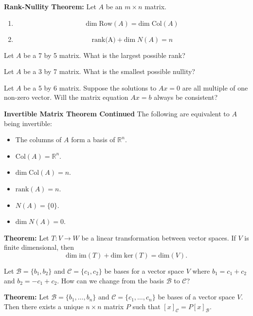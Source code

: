 \documentclass[12pt,letterpaper]{article}
\begin{document}
\newpage

{\bf Rank-Nullity Theorem:} Let $A$ be an $m\times n$ matrix.
\begin{enumerate}
\item[a.] $$\text{dim} \;\text{Row}(A)= \text{dim} \;\text{Col}(A)$$
\item[b.] $$\text{rank(A)}+\text{dim} \;N(A) =n$$
\end{enumerate}

\begin{enumerate}

\Problem 

\Part Let $A$ be a 7 by 5 matrix. What is the largest possible rank?

\vfill

\Part Let $A$ be a 3 by 7 matrix. What is the smallest possible nullity?

\vfill

\Part Let $A$ be a 5 by 6 matrix. Suppose the solutions to $Ax=0$ are all multiple of one non-zero vector. Will the matrix equation $Ax=b$ always be consistent?

\vfill


{\bf Invertible Matrix Theorem Continued} The following are equivalent to $A$ being invertible:
\begin{itemize}
\item[m.] The columns of $A$ form a basis of $\mathbb{R}^n$.
\item[n.] $\text{Col}(A)=\mathbb{R}^n$.
\item[o.] $\text{dim} \; \text{Col}(A)=n$.
\item[p.] $\text{rank}(A)=n$.
\item[q.] $N(A)=\{0\}$.
\item[r.] $\text{dim}\; N(A) =0$.
\end{itemize}


{\bf Theorem:} Let $T: V \to W$ be a linear transformation between vector spaces. If $V$ is finite dimensional, then $$\text{dim} \; \text{im}(T) + \text{dim} \; \text{ker}(T) =\text{dim}(V).$$


\newpage

\Problem Let $\mathcal{B}=\{b_1, b_2\}$ and $\mathcal{C}=\{c_1, c_2\}$ be bases for a vector space $V$ where $b_1= c_1+c_2$ and $b_2=-c_1+c_2$. How can we change from the basis $\mathcal{B}$ to $\mathcal{C}$?

\vfill

{\bf Theorem:} Let $\mathcal{B}=\{b_1, \dots, b_n\}$ and $\mathcal{C}=\{c_1, \dots, c_n\}$ be bases of a vector space $V$. Then there exists a unique $n\times n$ matrix $P$ such that $[x]_{\mathcal{C}}=P [x]_{\mathcal{B}}$.


\end{enumerate}
\end{document}
